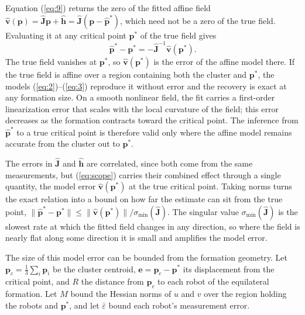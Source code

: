 \documentclass[lettersize,journal]{IEEEtran}
\begin{document}
Equation (\ref{eq:9}) returns the zero of the fitted affine field $\hat{\mathbf{v}}(\mathbf{p}) = \hat{\mathbf{J}}\mathbf{p} + \hat{\mathbf{h}} = \hat{\mathbf{J}}(\mathbf{p} - \hat{\mathbf{p}}^*)$, which need not be a zero of the true field. Evaluating it at any critical point $\mathbf{p}^*$ of the true field gives
\begin{equation}\label{eq:scope}
\hat{\mathbf{p}}^* - \mathbf{p}^* = -\hat{\mathbf{J}}^{-1}\hat{\mathbf{v}}(\mathbf{p}^*).
\end{equation}
The true field vanishes at $\mathbf{p}^*$, so $\hat{\mathbf{v}}(\mathbf{p}^*)$ is the error of the affine model there. If the true field is affine over a region containing both the cluster and $\mathbf{p}^*$, the models (\ref{eq:2})--(\ref{eq:3}) reproduce it without error and the recovery is exact at any formation size. On a smooth nonlinear field, the fit carries a first-order linearization error that scales with the local curvature of the field; this error decreases as the formation contracts toward the critical point. The inference from $\hat{\mathbf{p}}^*$ to a true critical point is therefore valid only where the affine model remains accurate from the cluster out to $\mathbf{p}^*$.

The errors in $\hat{\mathbf{J}}$ and $\hat{\mathbf{h}}$ are correlated, since both come from the same measurements, but (\ref{eq:scope}) carries their combined effect through a single quantity, the model error $\hat{\mathbf{v}}(\mathbf{p}^*)$ at the true critical point. Taking norms turns the exact relation into a bound on how far the estimate can sit from the true point, $\|\hat{\mathbf{p}}^* - \mathbf{p}^*\| \le \|\hat{\mathbf{v}}(\mathbf{p}^*)\|/\sigma_{\min}(\hat{\mathbf{J}})$. The singular value $\sigma_{\min}(\hat{\mathbf{J}})$ is the slowest rate at which the fitted field changes in any direction, so where the field is nearly flat along some direction it is small and amplifies the model error.

The size of this model error can be bounded from the formation geometry. Let $\mathbf{p}_c = \frac{1}{3}\sum_i\mathbf{p}_i$ be the cluster centroid, $\mathbf{e} = \mathbf{p}_c - \mathbf{p}^*$ its displacement from the critical point, and $R$ the distance from $\mathbf{p}_c$ to each robot of the equilateral formation. Let $M$ bound the Hessian norms of $u$ and $v$ over the region holding the robots and $\mathbf{p}^*$, and let $\bar{\varepsilon}$ bound each robot's measurement error.
\end{document}
